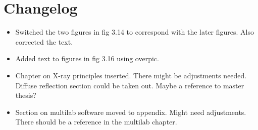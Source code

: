 \chapter{Changelog}

\begin{itemize}
  \item Switched the two figures in fig 3.14 to correspond with the later figures. Also corrected the text.
  \item Added text to figures in fig 3.16 using overpic.
  \item Chapter on X-ray principles inserted. There might be adjustments needed. Diffuse reflection section could be taken out. Maybe a reference to master thesis?
  \item Section on multilab software moved to appendix. Might need adjustments. There should be a reference in the multilab chapter.
\end{itemize}
